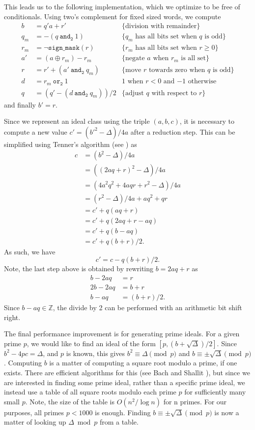 \documentclass{ucalgthes1}
\theoremstyle{definition}
\newcommand{\ZZ}{\mathbb{Z}}
\newcommand{\band}{~\texttt{and}_\texttt{2}~}
\newcommand{\bor}{~\texttt{or}_\texttt{2}~}
\newcommand{\bxor}{\oplus}
\newcommand{\bnot}{\lnot}
\begin{document}
This leads us to the following implementation, which we optimize to be free of conditionals.  Using two's complement for fixed sized words, we compute 
\begin{align*}
b   &= q'a + r' & \textrm{\{division with remainder\}}\\
q_m &= -(q \band 1) & \textrm{\{$q_m$ has all bits set when $q$ is odd\}} \\
r_m &= \bnot\texttt{sign\_mask}(r) & \textrm{\{$r_m$ has all bits set when $r \ge 0$\}} \\
a'  &= (a \bxor r_m) - r_m & \textrm{\{negate $a$ when $r_m$ is all set\}} \\
r   &= r' + (a' \band q_m) & \textrm{\{move $r$ towards zero when $q$ is odd\}} \\
d   &= r_m \bor 1 & \textrm{1 when $r < 0$ and $-1$ otherwise} \\
q   &= (q' - (d \band q_m))/2 & \textrm{\{adjust $q$ with respect to $r$\}}
\end{align*}
and finally $b' = r$.

Since we represent an ideal class using the triple $(a, b, c)$, it is necessary to compute a new value $c' = (b'^2 - \Delta)/4a$ after a reduction step.  This can be simplified using Tenner's algorithm (see \cite[\S 3.4]{Jacobson2009})  as
\begin{align*}
	c &= (b^2 - \Delta)/4a \\
	  &= ((2aq + r)^2 - \Delta)/4a \\
	  &= (4a^2q^2 + 4aqr + r^2 - \Delta)/4a \\
	  &= (r^2 - \Delta)/4a + aq^2 + qr \\
	  &= c' + q(aq + r) \\
	  &= c' + q(2aq + r - aq) \\
	  &= c' + q(b - aq) \\
	  &= c' + q(b + r)/2.
\end{align*}
As such, we have
\[
c' = c - q(b + r)/2.
\]
Note, the last step above is obtained by rewriting $b = 2aq + r$ as
\begin{align*}
	b - 2aq &= r \\
	2b - 2aq &= b + r \\
	b - aq &= (b+r)/2.
\end{align*}
Since $b - aq \in \ZZ$, the divide by 2 can be performed with an arithmetic bit shift right.

The final performance improvement is for generating prime ideals.  For a given prime $p$, we would like to find an ideal of the form $[p, (b + \sqrt\Delta)/2]$.  Since $b^2 - 4pc = \Delta$, and $p$ is known, this gives $b^2 \equiv \Delta \pmod p$ and $b \equiv \pm \sqrt\Delta \pmod p$.  Computing $b$ is a matter of computing a square root modulo a prime, if one exists.  There are efficient algorithms for this (see Bach and Shallit \cite{Bach1996}), but since we are interested in finding some prime ideal, rather than a specific prime ideal, we instead use a table of all square roots modulo each prime $p$ for sufficiently many small $p$.  Note, the size of the table is $O(n^2/\log n)$ for n primes.  For our purposes, all primes $p < 1000$ is enough.  Finding $b \equiv \pm\sqrt\Delta \pmod p$ is now a matter of looking up $\Delta \bmod p$ from a table.  
\end{document}
